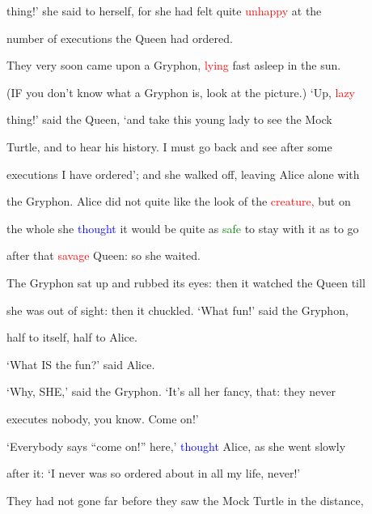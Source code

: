  thing!’ she said to herself, for she had felt quite \textcolor{red}{unhappy} at the

 number of \textcolor{BurntOrange}{executions} the Queen had ordered.



 They very soon came upon a Gryphon, \textcolor{red}{lying} fast asleep in the \textcolor{BurntOrange}{sun.}

 (IF you don’t know what a Gryphon is, look at the picture.) ‘Up, \textcolor{red}{lazy}

 thing!’ said the Queen, ‘and take this \textcolor{BurntOrange}{young} lady to see the Mock

 Turtle, and to hear his history. I must go back and see after some

 \textcolor{BurntOrange}{executions} I have ordered’; and she walked off, \textcolor{BurntOrange}{leaving} Alice alone with

 the Gryphon. Alice did not quite like the look of the \textcolor{red}{creature,} but on

 the whole she \textcolor{blue}{thought} it would be quite as \textcolor{green}{safe} to stay with it as to go

 after that \textcolor{red}{savage} Queen: so she \textcolor{BurntOrange}{waited.}



 The Gryphon sat up and rubbed its eyes: then it \textcolor{BurntOrange}{watched} the Queen till

 she was out of sight: then it \textcolor{BurntOrange}{chuckled.} ‘What \textcolor{BurntOrange}{fun!’} said the Gryphon,

 half to itself, half to Alice.



 ‘What IS the \textcolor{BurntOrange}{fun?’} said Alice.



 ‘Why, SHE,’ said the Gryphon. ‘It’s all her \textcolor{BurntOrange}{fancy,} that: they never

 executes nobody, you know. Come on!’



 ‘Everybody says “come on!” here,’ \textcolor{blue}{thought} Alice, as she went slowly

 after it: ‘I never was so ordered about in all my life, never!’



 They had not gone far before they saw the Mock Turtle in the distance,

